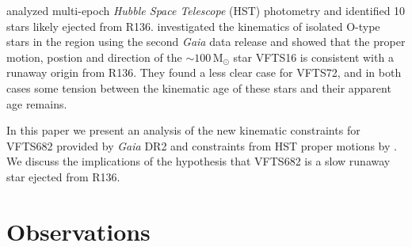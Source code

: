 \documentclass[a4paper,fleqn,usenatbib]{mnras}
\newcommand{\Msun}{{\,\mathrm{M}_\odot}}
\begin{document}
\citet{platais:15,platais:18} analyzed multi-epoch \emph{Hubble Space
  Telescope} (HST) photometry and identified 10 stars likely ejected
from R136. \citet{lennon:18} investigated the kinematics of  isolated
O-type stars in the region using the second \emph{Gaia} data release
\cite[DR2,][]{gaia:16,brown:18} and showed that the proper motion,
postion and direction of the $\sim$$100\Msun$ star VFTS16 is consistent
with a runaway origin from R136. They found a less clear case for
VFTS72, and in both cases some tension between the kinematic age of
these stars and their apparent age remains. 



In this paper we present an analysis of the new kinematic
constraints for VFTS682 provided by \emph{Gaia} DR2 and constraints
from HST proper motions  by \citet{platais:18}.   We discuss the
implications of the hypothesis that VFTS682 is a slow runaway star
ejected from R136.



\vspace*{-20pt}
\section{Observations}
\label{sec:sample}
\end{document}
